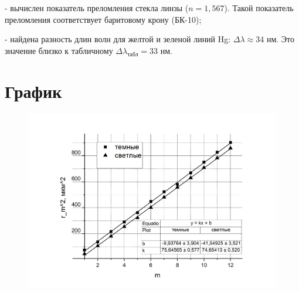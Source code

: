 \documentclass[a4paper,12pt]{article} %
\begin{document}
\medskip

\noindent - вычислен показатель преломления стекла линзы ($n = 1,567$). Такой показатель преломления соответствует баритовому крону (БК-10);

\medskip

\noindent - найдена разность длин волн для желтой и зеленой линий Hg: $\Delta \lambda \approx 34 \text{ нм}.$ Это значение близко к табличному $\Delta \lambda_\text{табл} = 33 \text{ нм}.$

\section{График}

\begin{figure}[h!]
 	\centering 	\includegraphics[width=0.8\linewidth]{график.png}
 \end{figure}
 
\end{document}
